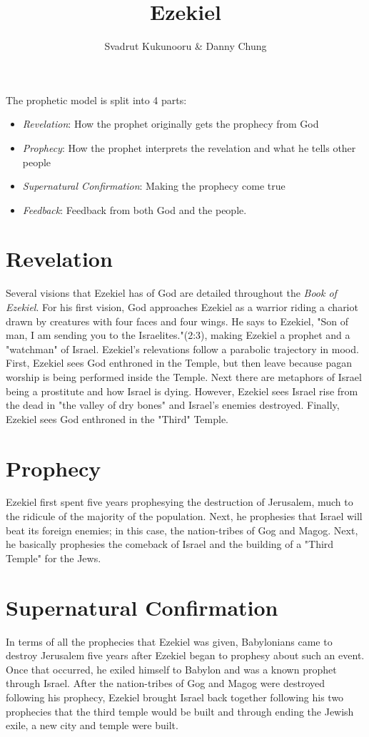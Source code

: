 \documentclass[a4paper]{article}
\title{Ezekiel}
\author{Svadrut Kukunooru \& Danny Chung}
\begin{document}
    \maketitle
    The prophetic model is split into 4 parts:
    \begin{itemize}
        \item \textit{Revelation}: How the prophet originally gets the prophecy from God
        \item \textit{Prophecy}: How the prophet interprets the revelation and what he tells other people
        \item \textit{Supernatural Confirmation}: Making the prophecy come true
        \item \textit{Feedback}: Feedback from both God and the people.
    \end{itemize}
\section{Revelation}%
\label{sec:Revelation}
Several visions that Ezekiel has of God are detailed throughout the \textit{Book of Ezekiel}. For his first vision, God approaches Ezekiel as a warrior riding a chariot drawn by creatures with four faces and four wings. He says to Ezekiel, "Son of man, I am sending you to the Israelites."(2:3), making Ezekiel a prophet and a "watchman" of Israel. Ezekiel's relevations follow a parabolic trajectory in mood. First, Ezekiel sees God enthroned in the Temple, but then leave because pagan worship is being performed inside the Temple. Next there are metaphors of Israel being a prostitute and how Israel is dying. However, Ezekiel sees Israel rise from the dead in "the valley of dry bones" and Israel's enemies destroyed. Finally, Ezekiel sees God enthroned in the "Third" Temple. 
\section{Prophecy}%
\label{sec:Prophecy}
Ezekiel first spent five years prophesying the destruction of Jerusalem, much to the ridicule of the majority of the population. Next, he prophesies that Israel will beat its foreign enemies; in this case, the nation-tribes of Gog and Magog. Next, he basically prophesies the comeback of Israel and the building of a "Third Temple" for the Jews. 
\section{Supernatural Confirmation}%
\label{sec:Supernatural Confirmation}
In terms of all the prophecies that Ezekiel was given, Babylonians came to destroy Jerusalem five years after Ezekiel began to prophesy about such an event. Once that occurred, he exiled himself to Babylon and was a known prophet through Israel. After the nation-tribes of Gog and Magog were destroyed following his prophecy, Ezekiel brought Israel back together following his two prophecies that the third temple would be built and through ending the Jewish exile, a new city and temple were built. 
\end{document}

